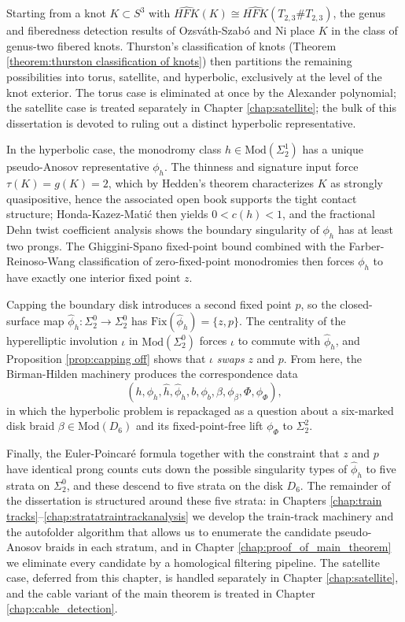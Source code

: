 Starting from a knot $K \subset S^3$ with $\widehat{HFK}(K) \cong \widehat{HFK}(T_{2,3} \# T_{2,3})$, the genus and fiberedness detection results of Ozsv\'{a}th-Szab\'{o} and Ni place $K$ in the class of genus-two fibered knots. Thurston's classification of knots (Theorem \ref{theorem:thurston classification of knots}) then partitions the remaining possibilities into torus, satellite, and hyperbolic, exclusively at the level of the knot exterior. The torus case is eliminated at once by the Alexander polynomial; the satellite case is treated separately in Chapter \ref{chap:satellite}; the bulk of this dissertation is devoted to ruling out a distinct hyperbolic representative.

In the hyperbolic case, the monodromy class $h \in \mathrm{Mod}(\Sigma_2^1)$ has a unique pseudo-Anosov representative $\phi_h$. The thinness and signature input force $\tau(K) = g(K) = 2$, which by Hedden's theorem characterizes $K$ as strongly quasipositive, hence the associated open book supports the tight contact structure; Honda-Kazez-Mati\'{c} then yields $0 < c(h) < 1$, and the fractional Dehn twist coefficient analysis shows the boundary singularity of $\phi_h$ has at least two prongs. The Ghiggini-Spano fixed-point bound combined with the Farber-Reinoso-Wang classification of zero-fixed-point monodromies then forces $\phi_h$ to have exactly one interior fixed point $z$.

Capping the boundary disk introduces a second fixed point $p$, so the closed-surface map $\hat{\phi}_h \colon \Sigma_2^0 \to \Sigma_2^0$ has $\mathrm{Fix}(\hat{\phi}_h) = \{z, p\}$. The centrality of the hyperelliptic involution $\iota$ in $\mathrm{Mod}(\Sigma_2^0)$ forces $\iota$ to commute with $\hat{\phi}_h$, and Proposition \ref{prop:capping off} shows that $\iota$ \emph{swaps} $z$ and $p$. From here, the Birman-Hilden machinery produces the correspondence data
\[
(h, \phi_h, \hat{h}, \hat{\phi}_h, b, \phi_b, \beta, \phi_\beta, \Phi, \phi_\Phi),
\]
in which the hyperbolic problem is repackaged as a question about a six-marked disk braid $\beta \in \mathrm{Mod}(D_6)$ and its fixed-point-free lift $\phi_\Phi$ to $\Sigma_2^2$.

Finally, the Euler-Poincar\'{e} formula together with the constraint that $z$ and $p$ have identical prong counts cuts down the possible singularity types of $\hat{\phi}_h$ to five strata on $\Sigma_2^0$, and these descend to five strata on the disk $D_6$. The remainder of the dissertation is structured around these five strata: in Chapters \ref{chap:train tracks}--\ref{chap:stratatraintrackanalysis} we develop the train-track machinery and the autofolder algorithm that allows us to enumerate the candidate pseudo-Anosov braids in each stratum, and in Chapter \ref{chap:proof_of_main_theorem} we eliminate every candidate by a homological filtering pipeline. The satellite case, deferred from this chapter, is handled separately in Chapter \ref{chap:satellite}, and the cable variant of the main theorem is treated in Chapter \ref{chap:cable_detection}.